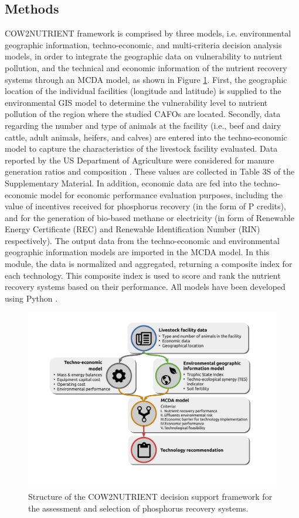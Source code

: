 \begin{refsection}[referencesCh4]
\section{Methods}
COW2NUTRIENT framework is comprised by three models, i.e. environmental geographic information, techno-economic, and multi-criteria decision analysis models, in order to integrate the geographic data on vulnerability to nutrient pollution, and the technical and economic information of the nutrient recovery systems through an MCDA model, as shown in Figure \ref{fig:tool_diagram}. First, the geographic location of the individual facilities (longitude and latitude) is supplied to the environmental GIS model to determine the vulnerability level to nutrient pollution of the region where the studied CAFOs are located. Secondly, data regarding the number and type of animals at the facility (i.e., beef and dairy cattle, adult animals, heifers, and calves) are entered into the techno-economic model to capture the characteristics of the livestock facility evaluated. Data reported by the US Department of Agriculture were considered for manure generation ratios \citep{Kellog2010} and composition \citep{USDAHandbook}. These values are collected in Table 3S of the Supplementary Material. In addition, economic data are fed into the techno-economic model for economic performance evaluation purposes, including the value of incentives received for phosphorus recovery (in the form of P credits), and for the generation of bio-based methane or electricity (in form of Renewable Energy Certificate (REC) and Renewable Identification Number (RIN) respectively). The output data from the techno-economic and environmental geographic information models are imported in the MCDA model. In this module, the data is normalized and aggregated, returning a composite index for each technology. This composite index is used to score and rank the nutrient recovery systems based on their performance. All models have been developed using Python \citep{Python}.


\begin{figure}[h]
	\centering
	\includegraphics[width=0.85\linewidth, trim={3cm 4cm 4cm 1.5cm},clip]{gfx/Chapter4/tool_diagram_v4color.pdf} 
	\caption{Structure of the COW2NUTRIENT decision support framework for the assessment and selection of phosphorus recovery systems.}
	\label{fig:tool_diagram}
\end{figure}


\end{refsection}
